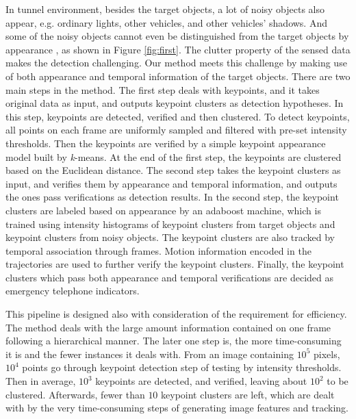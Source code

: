 In tunnel environment, besides the target objects, a lot of noisy objects also appear, e.g. ordinary lights, other vehicles, and other vehicles' shadows. And some of the noisy objects cannot even be distinguished from the target objects by appearance , as shown in Figure \ref{fig:first}. The clutter property of the sensed data makes the detection challenging.
Our method meets this challenge by making use of both appearance and temporal information of the target objects. There are two main steps in the method. The first step deals with keypoints, and  it takes original data as input, and outputs keypoint clusters as detection hypotheses. In this step, keypoints are detected, verified and then clustered. To detect keypoints, all points on each frame are uniformly sampled and filtered with pre-set intensity thresholds.  Then the keypoints are verified by a simple keypoint appearance model   built by \emph{k}-means. At the end of the first step, the keypoints are clustered based on the Euclidean distance. The second step takes the keypoint clusters as input, and verifies them by appearance and temporal information, and outputs the ones pass verifications as detection results. In the second step, the keypoint clusters are labeled based on appearance by an adaboost machine, which is trained using intensity histograms of keypoint clusters from target objects and keypoint clusters from noisy objects. The keypoint clusters are also tracked by temporal association through frames. Motion information encoded in the trajectories are used to further verify the keypoint clusters. Finally, the keypoint clusters which pass both appearance and temporal verifications are decided as emergency telephone indicators.

This pipeline is designed also with consideration of the requirement for efficiency.  The method deals with the large amount information contained on one frame following a hierarchical manner. The later one step is, the more time-consuming it is  and the fewer instances it deals with. From an image containing $10^5$ pixels, $10^4$ points go through keypoint detection step of testing by intensity thresholds. Then in average, $10^3$ keypoints are detected, and verified, leaving about $10^2$ to be clustered. Afterwards, fewer than $10$ keypoint clusters are left, which are dealt with by the very time-consuming steps of generating image features and tracking.






